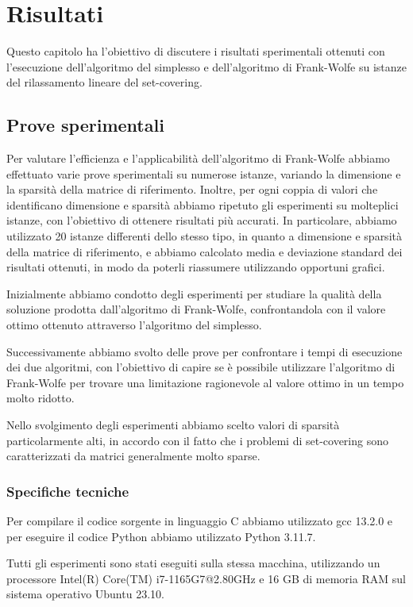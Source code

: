 \chapter{Risultati}
Questo capitolo ha l'obiettivo di discutere i risultati sperimentali ottenuti con l'esecuzione
dell'algoritmo del simplesso e dell'algoritmo di Frank-Wolfe su istanze del rilassamento lineare del set-covering.

\section{Prove sperimentali}
Per valutare l'efficienza e l'applicabilità dell'algoritmo di Frank-Wolfe abbiamo effettuato varie prove sperimentali su
numerose istanze, variando la dimensione e la sparsità della matrice di riferimento. Inoltre, per ogni coppia di valori
che identificano dimensione e sparsità abbiamo ripetuto gli esperimenti su molteplici istanze, con l'obiettivo di
ottenere risultati più accurati. In particolare, abbiamo utilizzato 20 istanze differenti dello stesso
tipo, in quanto a dimensione e sparsità della matrice di riferimento, e abbiamo calcolato media e deviazione standard dei
risultati ottenuti, in modo da poterli riassumere utilizzando opportuni grafici.

Inizialmente abbiamo condotto degli esperimenti per studiare la qualità della soluzione prodotta dall'algoritmo di
Frank-Wolfe, confrontandola con il valore ottimo ottenuto attraverso l'algoritmo del simplesso.

Successivamente abbiamo svolto delle prove per confrontare i tempi di esecuzione dei due algoritmi, con l'obiettivo di
capire se è possibile utilizzare l'algoritmo di Frank-Wolfe per trovare una limitazione ragionevole al valore ottimo in
un tempo molto ridotto.

Nello svolgimento degli esperimenti abbiamo scelto valori di sparsità particolarmente alti, in accordo con il fatto che
i problemi di set-covering sono caratterizzati da matrici generalmente molto sparse.


\subsection{Specifiche tecniche}
Per compilare il codice sorgente in linguaggio C abbiamo utilizzato gcc 13.2.0 e per eseguire il codice Python abbiamo
utilizzato Python 3.11.7.

Tutti gli esperimenti sono stati eseguiti sulla stessa macchina, utilizzando un processore Intel(R) Core(TM)
i7-1165G7@2.80GHz e 16 GB di memoria RAM sul sistema operativo Ubuntu 23.10.

